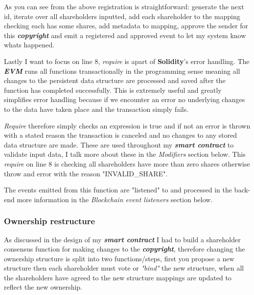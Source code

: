 \documentclass[12pt]{article}
\newcommand{\keyword}[1]{\textbf{\textit{#1}}}
\begin{document}
As you can see from the above registration is straightforward: generate the next id, iterate over all shareholders inputted, add each shareholder to the mapping checking each has some shares, add metadata to mapping, approve the sender for this \keyword{copyright} and emit a registered and approved event to let my system know whats happened.

Lastly I want to focus on line 8, \textit{require} is apart of \textbf{Solidity}'s error handling. The \keyword{EVM} runs all functions transactionally in the programming sense meaning all changes to the persistent data structure are processed and saved after the function has completed successfully. This is extremely useful and greatly simplifies error handling because if we encounter an error no underlying changes to the data have taken place and the transaction simply fails. 

\textit{Require} therefore simply checks an expression is true and if not an error is thrown with a stated reason the transaction is canceled and no changes to any stored data structure are made. These are used throughout my \keyword{smart contract} to validate input data, I talk more about these in the \textit{Modifiers} section below. This \textit{require} on line 8 is checking all shareholders have more than zero shares otherwise throw and error with the reason "INVALID\_SHARE".

The events emitted from this function are "listened" to and processed in the back-end more information in the \textit{Blockchain event listeners} section below.

\subsubsection{Ownership restructure}

As discussed in the design of my \keyword{smart contract} I had to build a shareholder consensus function for making changes to the \keyword{copyright}, therefore changing the ownership structure is split into two functions/steps, first you propose a new structure then each shareholder must vote or \textit{"bind"} the new structure, when all the shareholders have agreed to the new structure mappings are updated to reflect the new ownership.
\end{document}
